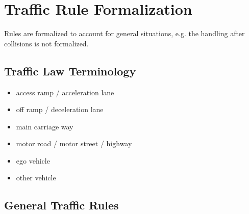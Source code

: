 
\section{Traffic Rule Formalization}
\label{sec:rule_formalization}
Rules are formalized to account for general situations, e.g. the handling after collisions is not formalized.
\subsection{Traffic Law Terminology}
\label{sec:def_law_terms}
\begin{itemize}
	\item access ramp / acceleration lane
	\item off ramp / deceleration lane
	\item main carriage way
	\item motor road / motor street / highway
	\item ego vehicle
	\item other vehicle
\end{itemize}

\subsection{General Traffic Rules}
\label{sec:general_rules}

